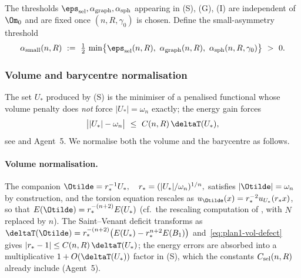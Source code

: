 The thresholds $\eps_{\rm sel}, \alpha_{\rm graph}, \alpha_{\rm sph}$
appearing in (S), (G), (I) are independent of $\Om_{0}$ and are fixed
once $(n,R,\gamma_{0})$ is chosen. Define the small-asymmetry threshold
\begin{equation}\label{eq:plan1-asmall}
   \alpha_{\rm small}(n,R)\ :=\
   \tfrac{1}{2}\,\min\bigl\{
      \eps_{\rm sel}(n,R),\ \alpha_{\rm graph}(n,R),\ \alpha_{\rm sph}(n,R,\gamma_{0})
   \bigr\}\ >\ 0.
\end{equation}

\subsubsection{Volume and barycentre normalisation}
\label{sec:plan1-vol-bary}

The set $U_{*}$ produced by (S) is the minimiser of a penalised
functional whose volume penalty does \emph{not} force $|U_{*}|=\omega_{n}$
exactly; the energy gain forces
\begin{equation}\label{eq:plan1-vol-defect}
   \bigl||U_{*}|-\omega_{n}\bigr|\ \le\ C(n,R)\,\deltaT(U_{*}),
\end{equation}
see \cite[Lemma~4.5]{BDV} and Agent~5. We normalise both the
volume and the barycentre as follows.

\paragraph{Volume normalisation.}
The companion
\(
   \Otilde=r_{*}^{-1}U_{*},
   \quad
   r_{*}=(|U_{*}|/\omega_{n})^{1/n},
\)
satisfies $|\Otilde|=\omega_{n}$ by construction, and the torsion
equation rescales as $u_{\Otilde}(x)=r_{*}^{-2}u_{U_{*}}(r_{*}x)$, so
that $E(\Otilde)=r_{*}^{-(n+2)}E(U_{*})$ (cf.\ the rescaling computation
of \cite[\S2]{BDV}, with $N$ replaced by $n$). The Saint--Venant
deficit transforms as
\(
   \deltaT(\Otilde)=r_{*}^{-(n+2)}\bigl(E(U_{*})-r_{*}^{n+2}E(B_{1})\bigr)
\)
and~\eqref{eq:plan1-vol-defect} gives $|r_{*}-1|\le C(n,R)\,\deltaT(U_{*})$;
the energy errors are absorbed into a multiplicative
$1+O(\deltaT(U_{*}))$ factor in (S), which the constants
$C_{\rm sel}(n,R)$ already include (Agent~5).

